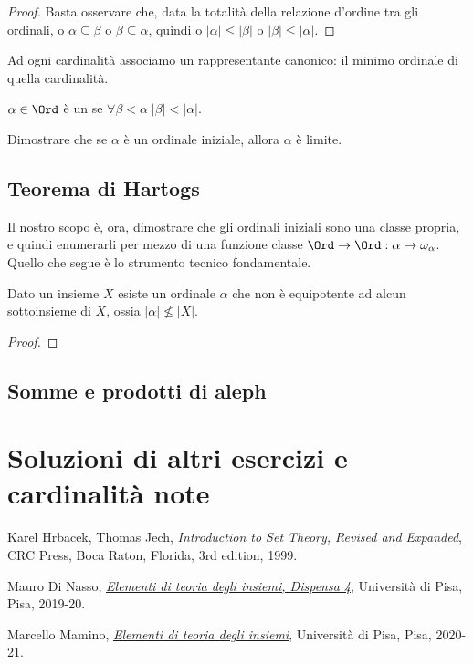 \documentclass[11pt]{scrartcl}
\begin{document}
\begin{proof}
	Basta osservare che, data la totalità della relazione d'ordine tra gli ordinali, o $\alpha \subseteq \beta$ o $\beta \subseteq \alpha$, quindi o $|\alpha| \leq |\beta|$ o $|\beta| \leq |\alpha|$.
\end{proof}

Ad ogni cardinalità associamo un rappresentante canonico: il minimo ordinale di quella cardinalità.

\begin{definition}
	$\alpha \in \Ord$ è un  se $\forall \beta < \alpha \; |\beta| < |\alpha|$.
\end{definition}

\begin{exercise}
	Dimostrare che se $\alpha$ è un ordinale iniziale, allora $\alpha$ è limite.
\end{exercise}

\subsection{Teorema di Hartogs}
Il nostro scopo è, ora, dimostrare che gli ordinali iniziali sono una classe propria, e quindi enumerarli per mezzo di una funzione classe $\Ord \rightarrow \Ord : \alpha \mapsto \omega_\alpha$.
Quello che segue è lo strumento tecnico fondamentale.

\begin{theorem}
	Dato un insieme $X$ esiste un ordinale $\alpha$ che non è equipotente ad alcun sottoinsieme di $X$, ossia $|\alpha| \not\leq |X|$.
\end{theorem}

\begin{proof}
	
\end{proof}

\subsection{Somme e prodotti di aleph}

\pagebreak
\appendix
\section{Soluzioni di altri esercizi e cardinalità note}
\pagebreak
\begin{thebibliography}{9}
	Karel Hrbacek, Thomas Jech,
	\textit{Introduction to Set Theory, Revised and Expanded},
	CRC Press, Boca Raton, Florida,
	3rd edition,
	1999.

	Mauro Di Nasso,
	\href{https://people.dm.unipi.it/dinasso/ETI/dispensa-04ss.pdf}{\textit{Elementi di teoria degli insiemi, Dispensa 4}},
	Università di Pisa, Pisa,
	2019-20.


	Marcello Mamino,
	\href{https://ciovil.li/eti20/}{\textit{Elementi di teoria degli insiemi}},
	Università di Pisa, Pisa,
	2020-21.
\end{thebibliography}
\end{document}

